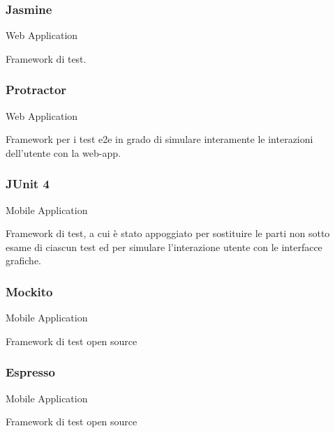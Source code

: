 \documentclass[../../../analisi-dei-requisiti.tex]{subfiles}
\begin{document}
\subsubsection{Jasmine}%
\label{subs:jasmine}
Web Application

Framework di test.

\subsubsection{Protractor}%
\label{subs:protractor}
Web Application

Framework per i test e2e in grado di simulare interamente le interazioni dell’utente con la web-app.

\subsubsection{JUnit 4}%
\label{subs:junit4}
Mobile Application

Framework di test, a cui è stato appoggiato  per sostituire le parti non sotto esame di ciascun test ed  per simulare l’interazione utente con le interfacce grafiche. 

\subsubsection{Mockito}%
\label{subs:mockito}
Mobile Application

Framework di test open source

\subsubsection{Espresso}%
\label{subs:espresso}
Mobile Application

Framework di test open source
\end{document}
